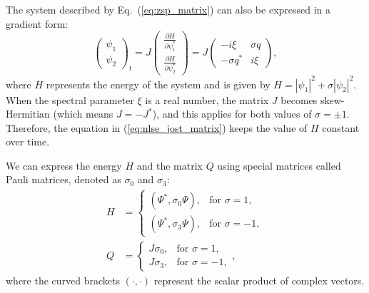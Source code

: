 The system described by Eq.~(\ref{eq:zsp_matrix}) can also be expressed in a gradient form:
\begin{equation}
    \begin{pmatrix} \psi_1 \\ \psi_2 \end{pmatrix}_t
    = J \begin{pmatrix} \frac{\partial H}{\partial \psi_1^*} \\ \frac{\partial H}{\partial \psi_2^*} \end{pmatrix}
    = J \begin{pmatrix} -i \xi & \sigma q \\ -\sigma q^* & i \xi \end{pmatrix},
    \label{eq:nlse_jost_matrix}
\end{equation}
where \( H \) represents the energy of the system and is given by \( H = |\psi_1|^2 + \sigma |\psi_2|^2 \). When the spectral parameter \( \xi \) is a real number, the matrix \( J \) becomes skew-Hermitian (which means \( J = -J^* \)), and this applies for both values of \( \sigma = \pm 1 \). Therefore, the equation in (\ref{eq:nlse_jost_matrix}) keeps the value of \( H \) constant over time.

We can express the energy \( H \) and the matrix \( Q \) using special matrices called Pauli matrices, denoted as \( \sigma_0 \) and \( \sigma_3 \):
\begin{align}
    H &= \begin{cases} (\Psi^*, \sigma_0 \Psi), & \text{for } \sigma = 1, \\ (\Psi^*, \sigma_3 \Psi), & \text{for } \sigma = -1, \end{cases} \\
    Q &= \begin{cases} J \sigma_0, & \text{for } \sigma = 1, \\ J \sigma_3, & \text{for } \sigma = -1, \end{cases},
\end{align}
where the curved brackets \( (\cdot, \cdot) \) represent the scalar product of complex vectors.




